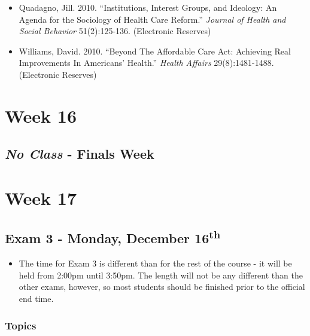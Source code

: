 \documentclass[]{book}
\providecommand{\tightlist}{%
  \setlength{\itemsep}{0pt}\setlength{\parskip}{0pt}}
\newenvironment{rmdblock}[1]
  {\begin{shaded*}
  \begin{itemize}
  \renewcommand{\labelitemi}{
    \raisebox{-.7\height}[0pt][0pt]{
      {\setkeys{Gin}{width=3em,keepaspectratio}\texttt{[image: images/\#1]}}
    }
  }
  \item
  }
  {
  \end{itemize}
  \end{shaded*}
  }
\newenvironment{rmdwarning}
  {\begin{rmdblock}{warning}}
  {\end{rmdblock}}
\begin{document}
\begin{itemize}
\tightlist
\item
  Quadagno, Jill. 2010. ``Institutions, Interest Groups, and Ideology: An Agenda for the Sociology of Health Care Reform.'' \emph{Journal of Health and Social Behavior} 51(2):125-136. (Electronic Reserves)
\item
  Williams, David. 2010. ``Beyond The Affordable Care Act: Achieving Real Improvements In Americans' Health.'' \emph{Health Affairs} 29(8):1481-1488. (Electronic Reserves)
\end{itemize}

\hypertarget{week-16}{%
\section*{Week 16}\label{week-16}}

\hypertarget{no-class---finals-week}{%
\subsection*{\texorpdfstring{\emph{No Class} - Finals Week}{No Class - Finals Week}}\label{no-class---finals-week}}

\hypertarget{week-17}{%
\section*{Week 17}\label{week-17}}

\hypertarget{exam-3---monday-december-16th}{%
\subsection*{\texorpdfstring{Exam 3 - Monday, December 16\textsuperscript{th}}{Exam 3 - Monday, December 16th}}\label{exam-3---monday-december-16th}}

\begin{rmdwarning}
The time for Exam 3 is different than for the rest of the course - it
will be held from 2:00pm until 3:50pm. The length will not be any
different than the other exams, however, so most students should be
finished prior to the official end time.
\end{rmdwarning}

\hypertarget{topics-30}{%
\subsubsection*{Topics}\label{topics-30}}
\end{document}
